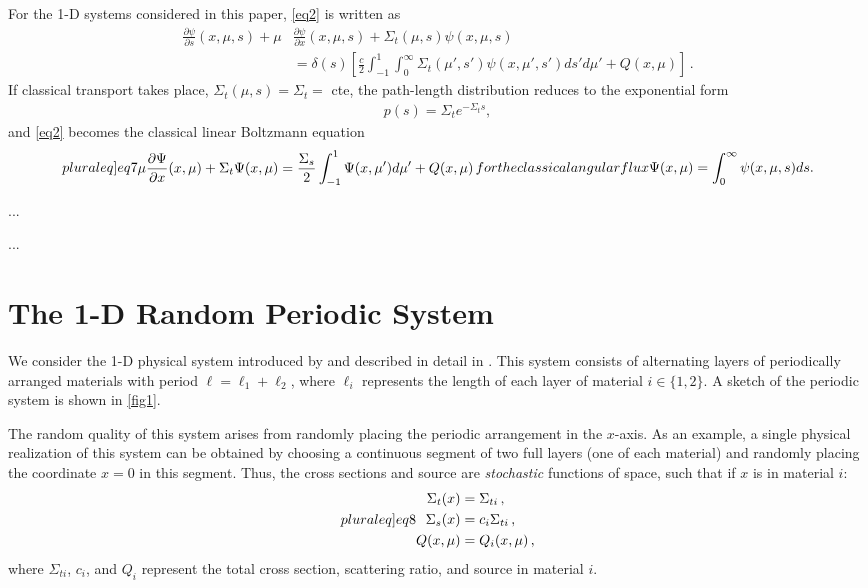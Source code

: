 \documentclass[12pt]{article}
\begin{document}
For the 1-D systems considered in this paper, \cref{eq2} is written as
\begin{align}\label{eq5}
\frac{\partial\psi}{\partial s}(x,\mu,s) + \mu&\frac{\partial \psi}{\partial x}(x,\mu,s) + \Sigma_t(\mu,s)\psi(x,\mu,s) 
\\& = \delta(s)\left[ \frac{c}{2}\int_{-1}^1\int_0^\infty \Sigma_t(\mu',s')\psi(x,\mu',s')ds' d\mu' + Q(x,\mu)\right]\,. \nonumber
\end{align}
If classical transport takes place, $\Sigma_t(\mu,s) = \Sigma_t =$ cte, 
the path-length distribution reduces to the exponential form
\begin{align}\label{eq6}
	p(s) = \Sigma_t e^{-\Sigma_t s},
\end{align}
and \cref{eq2} becomes the classical linear Boltzmann equation
\begin{subequations}\label[pluraleq]{eq7}
\begin{align}\label{eq7a}
\mu\frac{\partial\Psi}{\partial x}(x,\mu) + \Sigma_t\Psi(x,\mu) = \frac{\Sigma_s}{2}\int_{-1}^1\Psi(x,\mu')d\mu' +  Q(x,\mu) \,
\end{align}
for the classical angular flux 
\begin{align}
\Psi(x,\mu) = \int_0^\infty \psi(x,\mu,s)ds.
\end{align} 
\end{subequations}

...

...

\section{The 1-D Random Periodic System}\label{sec3}

We consider the 1-D physical system introduced by \cite{zuc94} and described in detail in \cite{nse16}.
This system consists of alternating layers of periodically arranged materials with period $\ell = \ell_1 + \ell_2$, where $\ell_i$ represents the length of each layer of material $i \in \{1,2\}$.
A sketch of the periodic system is shown in \cref{fig1}.

The random quality of this system arises from randomly placing the periodic arrangement in the $x$-axis.
As an example, a single physical realization of this system can be obtained by choosing a continuous segment of two full layers (one of each material) and randomly placing the coordinate $x=0$ in this segment.
Thus, the cross sections and source are {\em stochastic} functions of space, such that if $x$ is in material $i$:
\begin{subequations}\label[pluraleq]{eq8}
\begin{align}
\Sigma_t(x) &= \Sigma_{ti}\, ,\\
\Sigma_s(x) &= c_i \Sigma_{ti}\, ,\\
Q(x,\mu) &= Q_i(x,\mu) \, ,
\end{align}
\end{subequations}
where $\Sigma_{ti}$, $c_i$, and $Q_i$ represent the total cross section, scattering ratio, and source in material $i$. 
\end{document}
